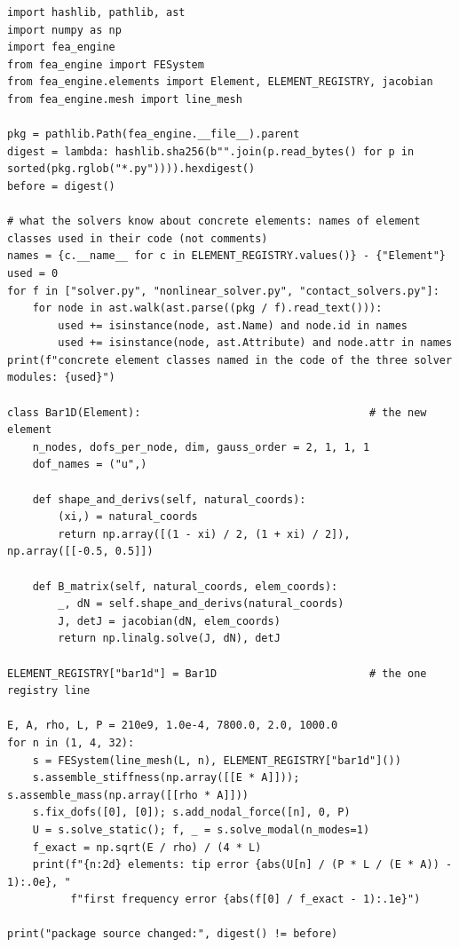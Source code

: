 \begin{lstlisting}[caption={A new element by subclassing, the one registry line, and a check that the package was not edited (run with the package on the path).},label={lst:ar-bar}]
import hashlib, pathlib, ast
import numpy as np
import fea_engine
from fea_engine import FESystem
from fea_engine.elements import Element, ELEMENT_REGISTRY, jacobian
from fea_engine.mesh import line_mesh

pkg = pathlib.Path(fea_engine.__file__).parent
digest = lambda: hashlib.sha256(b"".join(p.read_bytes() for p in sorted(pkg.rglob("*.py")))).hexdigest()
before = digest()

# what the solvers know about concrete elements: names of element classes used in their code (not comments)
names = {c.__name__ for c in ELEMENT_REGISTRY.values()} - {"Element"}
used = 0
for f in ["solver.py", "nonlinear_solver.py", "contact_solvers.py"]:
    for node in ast.walk(ast.parse((pkg / f).read_text())):
        used += isinstance(node, ast.Name) and node.id in names
        used += isinstance(node, ast.Attribute) and node.attr in names
print(f"concrete element classes named in the code of the three solver modules: {used}")

class Bar1D(Element):                                    # the new element
    n_nodes, dofs_per_node, dim, gauss_order = 2, 1, 1, 1
    dof_names = ("u",)

    def shape_and_derivs(self, natural_coords):
        (xi,) = natural_coords
        return np.array([(1 - xi) / 2, (1 + xi) / 2]), np.array([[-0.5, 0.5]])

    def B_matrix(self, natural_coords, elem_coords):
        _, dN = self.shape_and_derivs(natural_coords)
        J, detJ = jacobian(dN, elem_coords)
        return np.linalg.solve(J, dN), detJ

ELEMENT_REGISTRY["bar1d"] = Bar1D                        # the one registry line

E, A, rho, L, P = 210e9, 1.0e-4, 7800.0, 2.0, 1000.0
for n in (1, 4, 32):
    s = FESystem(line_mesh(L, n), ELEMENT_REGISTRY["bar1d"]())
    s.assemble_stiffness(np.array([[E * A]])); s.assemble_mass(np.array([[rho * A]]))
    s.fix_dofs([0], [0]); s.add_nodal_force([n], 0, P)
    U = s.solve_static(); f, _ = s.solve_modal(n_modes=1)
    f_exact = np.sqrt(E / rho) / (4 * L)
    print(f"{n:2d} elements: tip error {abs(U[n] / (P * L / (E * A)) - 1):.0e}, "
          f"first frequency error {abs(f[0] / f_exact - 1):.1e}")

print("package source changed:", digest() != before)
\end{lstlisting}


